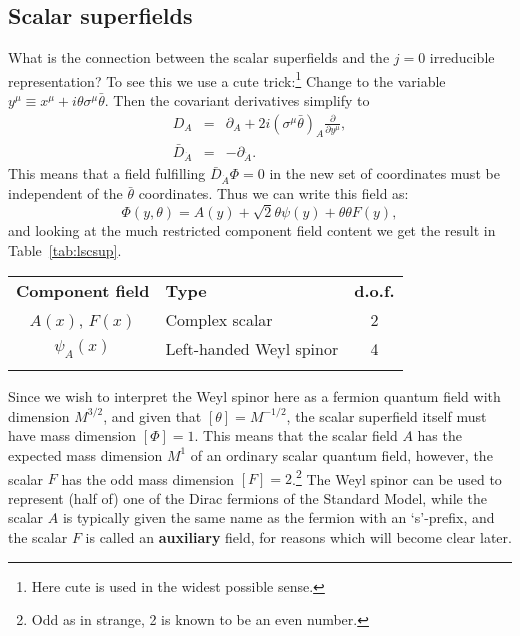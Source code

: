 \documentclass[notes.tex]{subfiles}
\begin{document}
\subsection{Scalar superfields}
What is the connection between the scalar superfields and the $j=0$ irreducible representation? To see this we use a cute trick:\footnote{Here cute is used in the widest possible sense.} Change to the variable $y^\mu \equiv x^\mu + i\theta\sigma^\mu \bar{\theta}$. Then the covariant derivatives simplify to
\begin{eqnarray}
D_A &=& \partial_A + 2i(\sigma^\mu\bar{\theta})_{A}\frac{\partial}{\partial y^\mu},\\
\bar{D}_{\dot{A}} &=& -\partial_{\dot{A}}.
\end{eqnarray}
This means that a field fulfilling $\bar{D}_{\dot{A}} \Phi = 0$ in the new set of coordinates must be independent of the $\bar{\theta}$ coordinates. Thus we can write this field as:
\begin{equation}
\Phi(y, \theta) = A(y) + \sqrt{2}\theta\psi(y) + \theta\theta F(y),
\label{eq:leftscalarsuperfield_y}
\end{equation}
and looking at the much restricted component field content we get the result in Table~\ref{tab:lscsup}. 
\begin{center}
   \begin{tabular}{c |l| c} 
   \noalign{\smallskip}\hline\noalign{\smallskip}
   {\bf Component field} & {\bf Type} & {\bf d.o.f.} \\
   \noalign{\smallskip}\hline\noalign{\smallskip}
   $A(x)$, $F(x)$ & Complex scalar & 2\\
   $\psi_A(x)$ & Left-handed Weyl spinor & 4\\
   \noalign{\smallskip}\hline\noalign{\smallskip}
    \end{tabular}
   \end{center}

Since we wish to interpret the Weyl spinor here as a fermion quantum field with dimension $M^{3/2}$, and given that $[\theta]=M^{-1/2}$, the scalar superfield itself must have mass dimension $[\Phi]=1$. This means that the scalar field $A$ has the expected mass dimension $M^1$ of an ordinary scalar quantum field, however, the scalar $F$ has the odd mass dimension $[F]=2$.\footnote{Odd as in strange, 2 is known to be an even number.} The Weyl spinor can be used to represent (half of) one of the Dirac fermions of the Standard Model, while the scalar $A$ is typically given the same name as the fermion with an `s'-prefix, and the scalar $F$ is called an {\bf auxiliary} field, for reasons which will become clear later.
\end{document}
